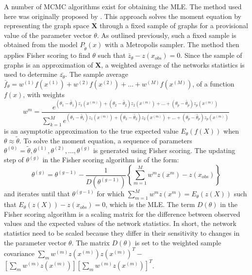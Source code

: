 \documentclass[a4paper, man]{apa6}
\begin{document}
A number of MCMC algorithms exist for obtaining the MLE. The method used here was originally proposed by . \clearpage \noindent This approach solves the moment equation by representing the graph space $\textbf{X}$ through a fixed sample of graphs for a provisional value of the parameter vector $\theta$. As outlined previously, such a fixed sample is obtained from the model $P_{\tilde{\theta}}(x)$ with a Metropolis sampler. The method then applies Fisher scoring to find $\theta$ such that $\bar{z}_\theta − z(x_{obs}) = 0$. Since the sample of graphs is an approximation of $\textbf{X}$, a weighted average of the networks statistics is used to determine $\bar{z_{\theta}}$. The sample average $\bar{f}_{\theta} = w^{(1)}f(x^{(1)}) + w^{(2)}f(x^{(2)}) + ... + w^{(M)}f(x^{(M)})$, of a function $f(x)$, with weights \begin{equation} \label{eqn:eqn6} w^{m} = \frac{e^{(\theta_{1} - \tilde{\theta_{1}})z_{1}(x^{(m)}) + (\theta_{2} - \tilde{\theta_{2}})z_{2}(x^{(m)}) + ... + (\theta_{p} - \tilde{\theta_{p}})z_{p}(x^{(m)})}}{\sum_{k=1}^{M}e^{(\theta_{1} - \tilde{\theta_{1}})z_{1}(x^{(m)}) + (\theta_{2} - \tilde{\theta_{2}})z_{2}(x^{(m)}) + ... + (\theta_{p} - \tilde{\theta_{p}})z_{p}(x^{(m)})}} \end{equation} is an asymptotic approximation to the true expected value $E_{\theta}(f(X))$ when $\theta \approx \tilde{\theta}$. To solve the moment equation, a sequence of parameters $\theta^{(0)} = \tilde{\theta}, \theta^{(1)}, \theta^{(2)}, ..., \theta^{(g)}$ is generated using Fisher scoring. The updating step of $\theta^{(g)}$ in the Fisher scoring algorithm is of the form: \begin{equation} \label{eqn:eqn7} \theta^{(g)} = \theta^{(g-1)} - \frac{1}{D(\theta^{(g-1)})} \left\{\sum_{m=1}^{M}w^{m}z(x^{m}) - z(x_{obs}) \right\} \end{equation} and iterates until that $\theta^{(g-1)}$ for which $\sum_{m=1}^{M}w^{m}z(x^{m}) = E_{\theta}(z(X))$ such that $E_{\theta}(z(X)) - z(x_{obs}) = 0$, which is the MLE. The term $D(\theta)$ in the Fisher scoring algorithm is a scaling matrix for the difference between observed values and the expected values of the network statistics. In short, the network statistics need to be scaled because they differ in their sensitivity to changes in the parameter vector $\theta$. The matrix $D(\theta)$ is set to the weighted sample covariance $\sum_{m}w^{(m)}z(x^{(m)})z(x^{(m)})^{T} - $ \\ \noindent $\left[ \sum_{m}w^{(m)}z(x^{(m)}) \right] \left[ \sum_{m}w^{(m)}z(x^{(m)}) \right]^{T}$. 
\\
\end{document}
